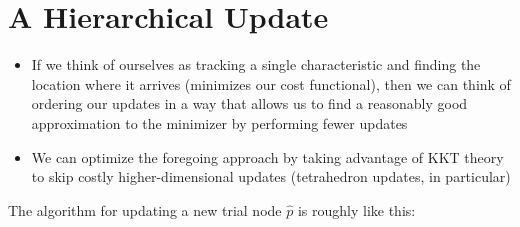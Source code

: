 \documentclass[eikonal.tex]{subfiles}
\begin{document}
\section{A Hierarchical Update}

\begin{itemize}
\item If we think of ourselves as tracking a single characteristic and
  finding the location where it arrives (minimizes our cost
  functional), then we can think of ordering our updates in a way that
  allows us to find a reasonably good approximation to the minimizer
  by performing fewer updates
\item We can optimize the foregoing approach by taking advantage of
  KKT theory to skip costly higher-dimensional updates (tetrahedron
  updates, in particular)
\end{itemize}
The algorithm for updating a new trial node $\hat{p}$ is roughly like this:
\end{document}
